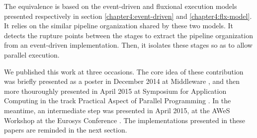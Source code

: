 The equivalence is based on the event-driven and fluxional execution models presented respectively in section \ref{chapter4:event-driven} and \ref{chapter4:flx-model}.
It relies on the similar pipeline organization shared by these two models.
It detects the rupture points between the stages to extract the pipeline organization from an event-driven implementation.
Then, it isolates these stages so as to allow parallel execution.

We published this work at three occasions.
The core idea of these contribution was briefly presented as a poster in December 2014 at Middleware \cite{Brodu2014}, and then more thouroughly presented in April 2015 at Symposium for Application Computing in the track Practical Aspect of Parallel Programming \cite{Brodu2015a}.
In the meantime, an intermediate step was presented in April 2015, at the AWeS Workshop at the Eurosys Conference \cite{Brodu2015}.
The implementations presented in these papers are reminded in the next section.
